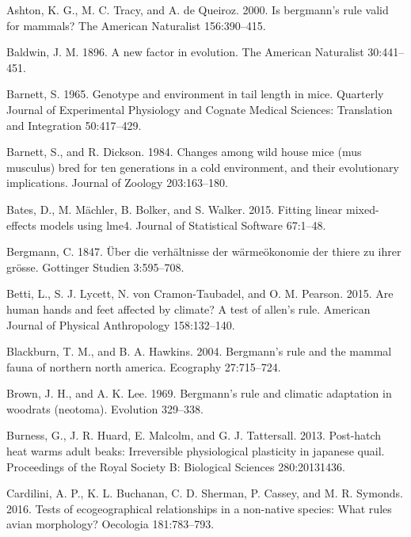 \documentclass[]{article}
\begin{document}
\leavevmode\hypertarget{ref-Ashton2000}{}%
Ashton, K. G., M. C. Tracy, and A. de Queiroz. 2000. Is bergmann's rule
valid for mammals? The American Naturalist 156:390--415.

\leavevmode\hypertarget{ref-Baldwin1896}{}%
Baldwin, J. M. 1896. A new factor in evolution. The American Naturalist
30:441--451.

\leavevmode\hypertarget{ref-Barnett1965}{}%
Barnett, S. 1965. Genotype and environment in tail length in mice.
Quarterly Journal of Experimental Physiology and Cognate Medical
Sciences: Translation and Integration 50:417--429.

\leavevmode\hypertarget{ref-Barnett1984}{}%
Barnett, S., and R. Dickson. 1984. Changes among wild house mice (mus
musculus) bred for ten generations in a cold environment, and their
evolutionary implications. Journal of Zoology 203:163--180.

\leavevmode\hypertarget{ref-Bates2015}{}%
Bates, D., M. Mächler, B. Bolker, and S. Walker. 2015. Fitting linear
mixed-effects models using lme4. Journal of Statistical Software
67:1--48.

\leavevmode\hypertarget{ref-Bergmann1847}{}%
Bergmann, C. 1847. Über die verhältnisse der wärmeökonomie der thiere zu
ihrer grösse. Gottinger Studien 3:595--708.

\leavevmode\hypertarget{ref-Betti2015}{}%
Betti, L., S. J. Lycett, N. von Cramon-Taubadel, and O. M. Pearson.
2015. Are human hands and feet affected by climate? A test of allen's
rule. American Journal of Physical Anthropology 158:132--140.

\leavevmode\hypertarget{ref-Blackburn2004}{}%
Blackburn, T. M., and B. A. Hawkins. 2004. Bergmann's rule and the
mammal fauna of northern north america. Ecography 27:715--724.

\leavevmode\hypertarget{ref-Brown1969}{}%
Brown, J. H., and A. K. Lee. 1969. Bergmann's rule and climatic
adaptation in woodrats (neotoma). Evolution 329--338.

\leavevmode\hypertarget{ref-Burness2013}{}%
Burness, G., J. R. Huard, E. Malcolm, and G. J. Tattersall. 2013.
Post-hatch heat warms adult beaks: Irreversible physiological plasticity
in japanese quail. Proceedings of the Royal Society B: Biological
Sciences 280:20131436.

\leavevmode\hypertarget{ref-Cardilini2016}{}%
Cardilini, A. P., K. L. Buchanan, C. D. Sherman, P. Cassey, and M. R.
Symonds. 2016. Tests of ecogeographical relationships in a non-native
species: What rules avian morphology? Oecologia 181:783--793.
\end{document}
